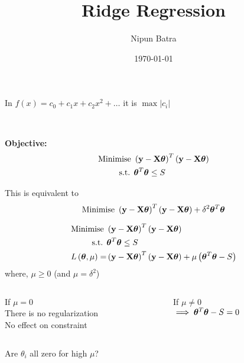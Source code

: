 \documentclass{beamer}
\title{Ridge Regression}
\date{\today}
\author{Nipun Batra}
\institute{IIT Gandhinagar}
\begin{document}
  \maketitle

\begin{frame}In $f(x) = c_0 + c_1x + c_2x^2 + \dots$ it is $\max|c_i|$ \\ \bigskip
\end{frame}
  
\begin{frame}\\ \bigskip
\begin{tcolorbox}
\textbf{Objective:}
\begin{align*}
\text{Minimise } & \left(\mathbf{y}-\mathbf{X}\boldsymbol{\theta}\right)^T\left(\mathbf{y}-\mathbf{X}\boldsymbol{\theta}\right) \\
\text{s.t. } & \boldsymbol{\theta} ^T\boldsymbol{\theta} \leq S
\end{align*}
\end{tcolorbox}
\pause
This is equivalent to \vspace{-0.4cm}
$$
\text{Minimise } \left(\mathbf{y}-\mathbf{X}\boldsymbol{\theta}\right)^T\left(\mathbf{y}-\mathbf{X}\boldsymbol{\theta}\right) + \delta ^2\boldsymbol{\theta} ^T\boldsymbol{\theta}
$$
\end{frame}  

\begin{frame}\begin{align*}
\text{Minimise } & \left(\mathbf{y}-\mathbf{X}\boldsymbol{\theta}\right)^T\left(\mathbf{y}-\mathbf{X}\boldsymbol{\theta}\right) \\
\text{s.t. } & \boldsymbol{\theta} ^T\boldsymbol{\theta} \leq S \\
L\left(\boldsymbol{\theta}, \mu \right) =& \left(\mathbf{y}-\mathbf{X}\boldsymbol{\theta}\right)^T\left(\mathbf{y}-\mathbf{X}\boldsymbol{\theta}\right) + \mu\left(\boldsymbol{\theta}^T\boldsymbol{\theta} - S\right)
\end{align*}
where, $\mu \geq 0$ (and $\mu = \delta^2$)\bigskip

\pause
\begin{columns}
\begin{column}{0.4\textwidth}
If $\mu = 0$ \\
There is no regularization \\
No effect on constraint
\end{column}
\pause
\begin{column}{0.4\textwidth}
If $\mu\neq 0$ \\
$\implies \boldsymbol{\theta}^T\boldsymbol{\theta} - S = 0$ 
\end{column}
\end{columns}
\end{frame}

\begin{frame}Are $\theta_{i}$ all zero for high $\mu$?
\end{frame}
\end{document}

